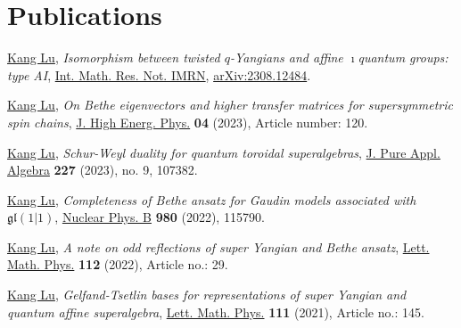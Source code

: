 \documentclass[11pt,letterpaper,roman,colorlinks,urlcolor=blue,linkcolor=blue
]{moderncv}
\begin{document}
\section{Publications}

\begin{etaremune}[leftmargin=1.17cm]
\item \underline{Kang Lu}, {\textit{Isomorphism between twisted $q$-Yangians and affine $\imath$quantum groups: type AI}}, \href{https://doi.org/10.1093/imrn/rnae248}{Int. Math. Res. Not. IMRN},  \href{https://arxiv.org/abs/2308.12484}{arXiv:2308.12484}. 

\item \underline{Kang Lu}, {\textit{On Bethe eigenvectors and higher transfer matrices for supersymmetric spin chains}}, \href{https://doi.org/10.1007/JHEP04(2023)120}{J. High Energ. Phys.} \textbf{04} (2023), Article number: 120.

\item \underline{Kang Lu}, {\textit{Schur-Weyl duality for quantum toroidal superalgebras}}, \href{https://doi.org/10.1016/j.jpaa.2023.107382}{J. Pure Appl. Algebra} \textbf{227} (2023), no. 9, 107382.


\item \underline{Kang Lu}, {\textit{Completeness of Bethe ansatz for Gaudin models associated with} $\mathfrak{gl}(1|1)$}, \href{https://www.sciencedirect.com/science/article/pii/S0550321322001419}{Nuclear Phys. B} \textbf{980} (2022), 115790.

\item \underline{Kang Lu}, {\textit{A note on odd reflections of super Yangian and Bethe ansatz}}, \href{https://link.springer.com/article/10.1007/s11005-022-01524-3}{Lett. Math. Phys.} \textbf{112} (2022), Article no.: 29.

\item \underline{Kang Lu}, {\textit{Gelfand-Tsetlin bases for representations of super Yangian and quantum affine superalgebra}}, \href{https://link.springer.com/article/10.1007/s11005-021-01488-w}{Lett. Math. Phys.} \textbf{111} (2021), Article no.: 145.


\end{etaremune}
\end{document}
